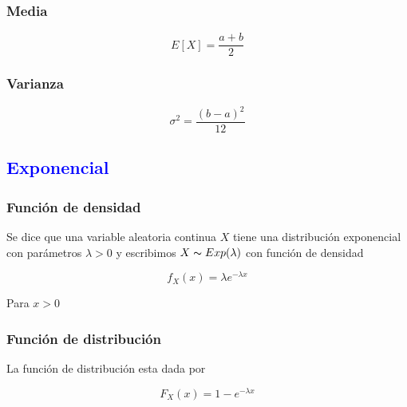 \documentclass{article}
\begin{document}
\begin{multicols}{2}
            \subsubsection{Media}

                \begin{equation*}
                    E[X] = \frac{a+b}{2}
                \end{equation*}
                
            \subsubsection{Varianza}

                \begin{equation*}
                    \sigma ^2 = \frac{(b-a)^2}{12}
                \end{equation*}

        \subsection{\textcolor{blue}{Exponencial}}

            \subsubsection{Función de densidad}

                Se dice que una variable aleatoria continua $X$ tiene una distribución exponencial con parámetros $\lambda > 0 $ y escribimos $X\thicksim Exp(\lambda)$ con función de densidad

                    \begin{equation*}
                        f_X (x) = \lambda e^{-\lambda x}
                    \end{equation*}

                Para $x>0$

            \subsubsection{Función de distribución}

                La función de distribución esta dada por

                    \begin{equation*}
                        F_X (x) =1-e^{-\lambda x}
                    \end{equation*}


\end{multicols}
\end{document}
